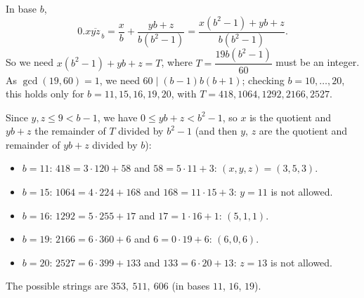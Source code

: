 In base $b$,
\[0.x\overline{yz}_{\,b}=\dfrac xb+\dfrac{yb+z}{b\left(b^2-1\right)}=\dfrac{x\left(b^2-1\right)+yb+z}{b\left(b^2-1\right)}.\]
So we need $x\left(b^2-1\right)+yb+z=T$, where $T=\dfrac{19b\left(b^2-1\right)}{60}$ must be an integer. As $\gcd(19,60)=1$, we need $60\mid(b-1)b(b+1)$; checking $b=10,\dots,20$, this holds only for $b=11,15,16,19,20$, with $T=418,1064,1292,2166,2527$.

Since $y,z\le9<b-1$, we have $0\le yb+z<b^2-1$, so $x$ is the quotient and $yb+z$ the remainder of $T$ divided by $b^2-1$ (and then $y$, $z$ are the quotient and remainder of $yb+z$ divided by $b$):
\begin{itemize}
\item $b=11$: $418=3\cdot120+58$ and $58=5\cdot11+3$: $(x,y,z)=(3,5,3)$.
\item $b=15$: $1064=4\cdot224+168$ and $168=11\cdot15+3$: $y=11$ is not allowed.
\item $b=16$: $1292=5\cdot255+17$ and $17=1\cdot16+1$: $(5,1,1)$.
\item $b=19$: $2166=6\cdot360+6$ and $6=0\cdot19+6$: $(6,0,6)$.
\item $b=20$: $2527=6\cdot399+133$ and $133=6\cdot20+13$: $z=13$ is not allowed.
\end{itemize}
The possible strings are $\boxed{353,\ 511,\ 606}$ (in bases $11$, $16$, $19$).
